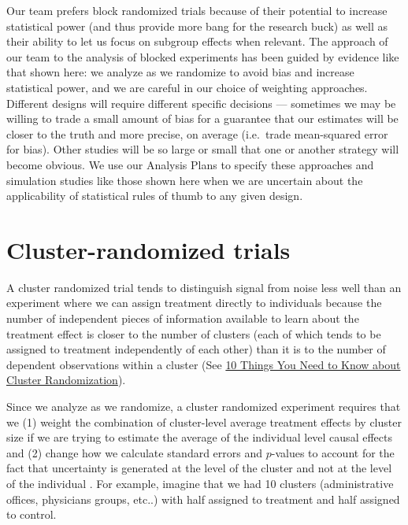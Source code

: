 \documentclass[
  12pt,
]{book}
\theoremstyle{definition}
\theoremstyle{definition}
\theoremstyle{definition}
\theoremstyle{remark}
\begin{document}
Our team prefers block randomized trials because of their potential to
increase statistical power (and thus provide more bang for the research
buck) as well as their ability to let us focus on subgroup effects when
relevant. The approach of our team to the analysis of blocked
experiments has been guided by evidence like that shown here: we analyze
as we randomize to avoid bias and increase statistical power, and we are
careful in our choice of weighting approaches. Different designs will
require different specific decisions --- sometimes we may be willing to
trade a small amount of bias for a guarantee that our estimates will be
closer to the truth and more precise, on average (i.e.~trade
mean-squared error for bias). Other studies will be so large or small
that one or another strategy will become obvious. We use our Analysis
Plans to specify these approaches and simulation studies like those
shown here when we are uncertain about the applicability of statistical
rules of thumb to any given design.

\hypertarget{clusterrandanalysis}{%
\section{Cluster-randomized trials}\label{clusterrandanalysis}}

A cluster randomized trial tends to distinguish signal from noise less
well than an experiment where we can assign treatment directly to
individuals because the number of independent pieces of information
available to learn about the treatment effect is closer to the number of
clusters (each of which tends to be assigned to treatment independently
of each other) than it is to the number of dependent observations within
a cluster (See
\href{https://egap.org/methods-guides/10-things-you-need-know-about-cluster-randomization}{10
Things You Need to Know about Cluster Randomization}).

Since we analyze as we randomize, a cluster randomized experiment
requires that we (1) weight the combination of cluster-level average
treatment effects by cluster size if we are trying to estimate the
average of the individual level causal effects
\citep{middleton2015unbiased} and (2) change how we calculate standard
errors and \(p\)-values to account for the fact that uncertainty is
generated at the level of the cluster and not at the level of the
individual \citep{hansen_covariate_2008, gerber_field_2012}. For
example, imagine that we had 10 clusters (administrative offices,
physicians groups, etc..) with half assigned to treatment and half
assigned to control.
\end{document}
